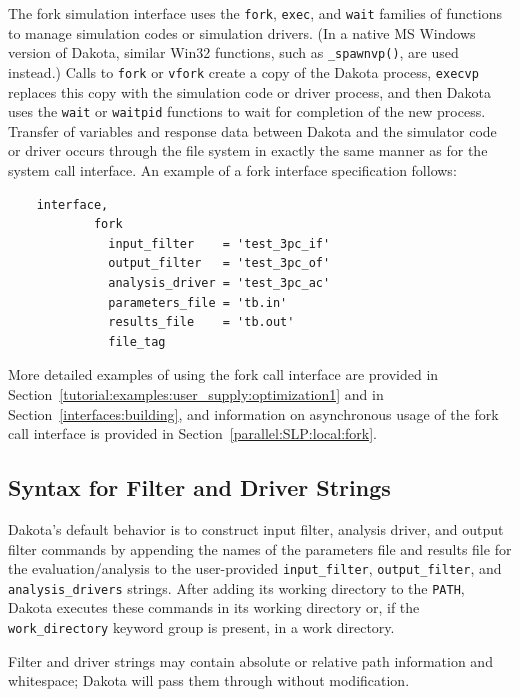 The fork simulation interface uses the \texttt{fork}, \texttt{exec},
and \texttt{wait} families of functions to manage simulation codes or
simulation drivers. (In a native MS Windows version of Dakota, similar
Win32 functions, such as \texttt{\_spawnvp()}, are used instead.)
Calls to \texttt{fork} or \texttt{vfork} create a
copy of the Dakota process, \texttt{execvp} replaces this copy with
the simulation code or driver process, and then Dakota uses the
\texttt{wait} or \texttt{waitpid} functions to wait for completion of
the new process. Transfer of variables and response data between
Dakota and the simulator code or driver occurs through the file system
in exactly the same manner as for the system call interface. An
example of a fork interface specification follows:
\begin{small}
\begin{verbatim}
    interface,
            fork
              input_filter    = 'test_3pc_if'
              output_filter   = 'test_3pc_of'
              analysis_driver = 'test_3pc_ac'
              parameters_file = 'tb.in'
              results_file    = 'tb.out'
              file_tag
\end{verbatim}
\end{small}

More detailed examples of using the fork call interface are provided
in Section~\ref{tutorial:examples:user_supply:optimization1} and in
Section~\ref{interfaces:building}, and information on asynchronous usage
of the fork call interface is provided in
Section~\ref{parallel:SLP:local:fork}.


\subsection{Syntax for Filter and Driver Strings}\label{interfaces:syntax}

Dakota's default behavior is to construct input filter, analysis driver, and
output filter commands by appending the names of the parameters file and results file
for the evaluation/analysis to the user-provided
\texttt{input\_filter}, \texttt{output\_filter}, and \texttt{analysis\_drivers} 
strings. After adding its working directory to the \texttt{PATH}, Dakota executes 
these commands in its working directory or, if the \texttt{work\_directory} keyword 
group is present, in a work directory.

Filter and driver strings may contain absolute or relative path information and 
whitespace; Dakota will pass them through without modification.

